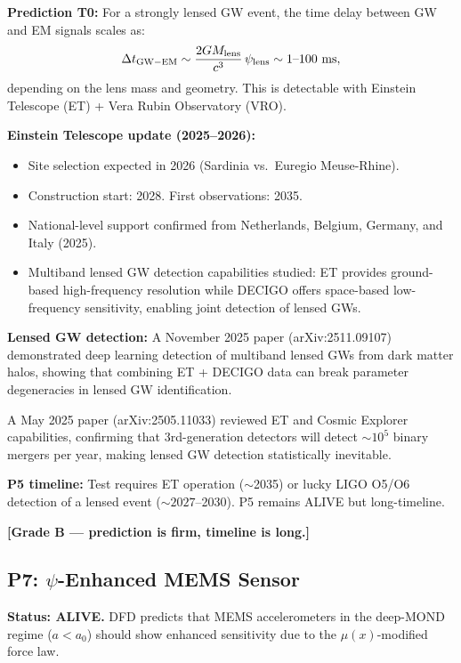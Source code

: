 \documentclass[11pt]{article}
\newcommand{\aM}{a_0}
\begin{document}
\textbf{Prediction T0:} For a strongly lensed GW event, the time delay
between GW and EM signals scales as:
\begin{equation}
  \Delta t_{\rm GW-EM} \sim \frac{2G M_{\rm lens}}{c^3}\,\psi_{\rm lens}
  \sim 1\text{--}100 \text{ ms},
\end{equation}
depending on the lens mass and geometry. This is detectable with
Einstein Telescope (ET) + Vera Rubin Observatory (VRO).

\textbf{Einstein Telescope update (2025--2026):}
\begin{itemize}
  \item Site selection expected in 2026 (Sardinia vs.\ Euregio Meuse-Rhine).
  \item Construction start: 2028. First observations: 2035.
  \item National-level support confirmed from Netherlands, Belgium,
    Germany, and Italy (2025).
  \item Multiband lensed GW detection capabilities studied:
    ET provides ground-based high-frequency resolution while DECIGO
    offers space-based low-frequency sensitivity, enabling joint
    detection of lensed GWs.
\end{itemize}

\textbf{Lensed GW detection:}
A November 2025 paper (arXiv:2511.09107) demonstrated deep learning
detection of multiband lensed GWs from dark matter halos, showing that
combining ET + DECIGO data can break parameter degeneracies in lensed
GW identification.

A May 2025 paper (arXiv:2505.11033) reviewed ET and Cosmic Explorer
capabilities, confirming that 3rd-generation detectors will detect
$\sim 10^5$ binary mergers per year, making lensed GW detection
statistically inevitable.

\textbf{P5 timeline:} Test requires ET operation ($\sim$2035) or
lucky LIGO O5/O6 detection of a lensed event ($\sim 2027$--2030).
P5 remains ALIVE but long-timeline.

\textbf{[Grade B --- prediction is firm, timeline is long.]}

\subsection{P7: $\psi$-Enhanced MEMS Sensor}

\textbf{Status: ALIVE.} DFD predicts that MEMS accelerometers in the
deep-MOND regime ($a < \aM$) should show enhanced sensitivity due to
the $\mu(x)$-modified force law.
\end{document}
